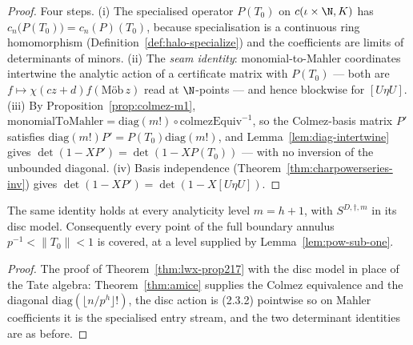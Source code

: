 \begin{proof}
  \leanok
  Four steps.  (i) The specialised operator $P(T_0)$ on $c(\iota\times\N,K)$ has
  $c_n\bigl(P(T_0)\bigr) = c_n(P)(T_0)$, because specialisation is a continuous ring homomorphism
  (Definition~\ref{def:halo-specialize}) and the coefficients are limits of determinants of
  minors.  (ii) The \emph{seam identity}: monomial-to-Mahler coordinates intertwine the analytic
  action of a certificate matrix with $P(T_0)$ --- both are $f\mapsto \chi(cz+d)f(\text{M\"ob}\,z)$
  read at $\N$-points --- and hence blockwise for $[U\eta U]$.  (iii) By
  Proposition~\ref{prop:colmez-m1}, $\mathrm{monomialToMahler} = \mathrm{diag}(m!)\circ
  \mathrm{colmezEquiv}^{-1}$, so the Colmez-basis matrix $P'$ satisfies
  $\mathrm{diag}(m!)P' = P(T_0)\mathrm{diag}(m!)$, and Lemma~\ref{lem:diag-intertwine} gives
  $\det(1-XP') = \det(1-XP(T_0))$ --- with no inversion of the unbounded diagonal.  (iv) Basis
  independence (Theorem~\ref{thm:charpowerseries-inv}) gives
  $\det(1-XP') = \det(1-X[U\eta U])$.
\end{proof}

\begin{theorem}
  \label{thm:lwx-prop217-h}
  \leanok
  The same identity holds at every analyticity level $m = h+1$, with $S^{D,\dagger,m}$ in its
  disc model.  Consequently every point of the full boundary annulus
  $p^{-1}<\lVert T_0\rVert<1$ is covered, at a level supplied by Lemma~\ref{lem:pow-sub-one}.
\end{theorem}

\begin{proof}
  \leanok
  The proof of Theorem~\ref{thm:lwx-prop217} with the disc model in place of the Tate algebra:
  Theorem~\ref{thm:amice} supplies the Colmez equivalence and the diagonal
  $\mathrm{diag}(\lfloor n/p^{h}\rfloor!)$, the disc action is (2.3.2) pointwise so on Mahler
  coefficients it is the specialised entry stream, and the two determinant identities are as
  before.
\end{proof}

